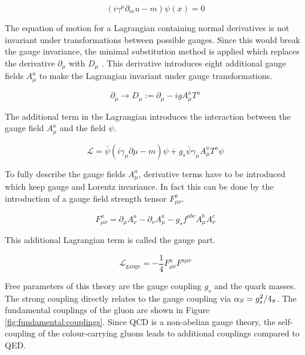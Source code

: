 \begin{equation}
(i\gamma^\mu \partial_mu -m) \psi(x) = 0
\end{equation}

The equation of motion for a Lagrangian containing normal derivatives is not invariant under transformations between possible gauges. Since this would break the gauge invariance, the minimal substitution method is applied which replaces the derivative $\partial_\mu$ with $D_\mu$ . This derivative introduces eight additional gauge fields $A_\mu^a$ to make the Lagrangian invariant under gauge transformations.

\begin{equation}
\partial_\mu \rightarrow D_\mu := \partial_\mu - ig A_\mu^a T^a
\end{equation} 

The additional term in the Lagrangian introduces the interaction between the gauge field $A_\mu^a$ and the field $\psi$. 

\begin{equation}
\mathcal{L} = \bar \psi (i \gamma_{\mu} \partial \mu -m) \psi + g_s \bar \psi \gamma_\mu A_\mu^a T^a \psi
\end{equation}

To fully describe the gauge fields $A_\mu^a$, derivative terms have to be introduced which keep gauge and Lorentz invariance. In fact this can be done by the introduction of a gauge field strength tensor $F_{\mu \nu}^a$. 

\begin{equation}
F_{\mu\nu}^{a} = \partial_\mu A_\nu^a - \partial_\nu A_\mu^a - g_s f^{abc} A_\mu^b A_\nu^c
\end{equation}

This additional Lagrangian term is called the gauge part.

\begin{equation}
\mathcal{L}_{\mathrm{gauge}} = - \frac{1}{4} F_{\mu \nu}^a F^{a \mu \nu}
\end{equation}


Free parameters of this theory are the gauge coupling $g_s$ and the quark masses. The strong coupling directly relates to the gauge coupling via $\alpha_S = g_s^2/4_\pi$. The fundamental couplings of the gluon are shown in Figure \ref{fig:fundamental:couplings}. Since QCD is a non-abelian gauge theory, the self-coupling of the colour-carrying gluons leads to additional couplings compared to QED.

